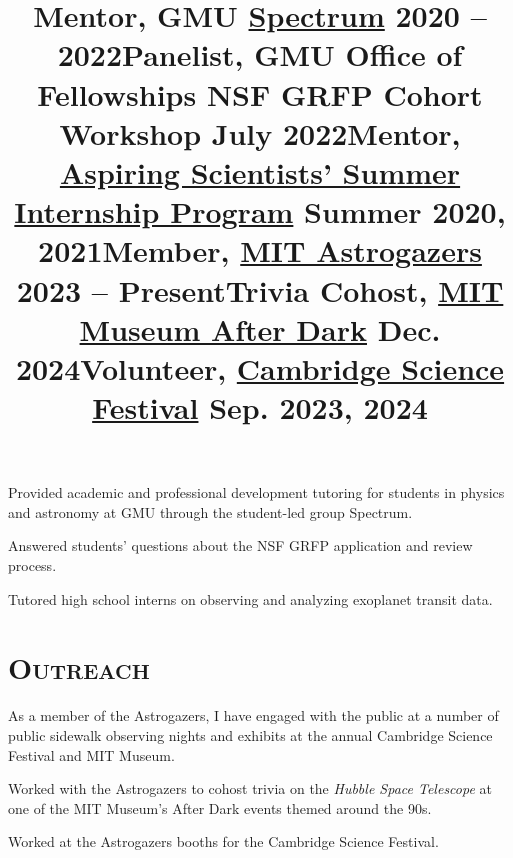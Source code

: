 \documentclass[marg, centered]{res}
\begin{document}
\begin{resume}
\vspace{-0.2cm}
\title{\textbf{Mentor}, GMU \href{https://gmuspectrum.squarespace.com/}{\color{dkbu} Spectrum} \hfill \textbf{2020 -- 2022}}
\begin{position}
{\small Provided academic and professional development tutoring for students in physics and astronomy at GMU through the student-led group Spectrum.}
\end{position}

\vspace{-0.2cm}
\title{\textbf{Panelist}, GMU Office of Fellowships NSF GRFP Cohort Workshop \hfill \textbf{July 2022}}
\begin{position}
{\small Answered students' questions about the NSF GRFP application and review process.}
\end{position}

\vspace{-0.2cm}
\title{\textbf{Mentor}, \href{https://science.gmu.edu/assip}{\color{dkbu} Aspiring Scientists' Summer Internship Program} \hfill \textbf{Summer 2020, 2021}}
\begin{position}
{\small Tutored high school interns on observing and analyzing exoplanet transit data.}
\end{position}

\section{{\scshape \bfseries Outreach}}

\title{\textbf{Member}, \href{https://astrogazers.mit.edu/}{\color{dkbu} MIT Astrogazers} \hfill \textbf{2023 -- Present}}
\begin{position}
{\small As a member of the Astrogazers, I have engaged with the public at a number of public sidewalk observing nights and exhibits at the annual Cambridge Science Festival and MIT Museum.}
\end{position}

\vspace{-0.2cm}
\title{\textbf{Trivia Cohost}, \href{https://mitmuseum.mit.edu/programs/mit-museum-after-dark}{\color{dkbu} MIT Museum After Dark} \hfill \textbf{Dec. 2024}}
\begin{position}
{\small Worked with the Astrogazers to cohost trivia on the \textit{Hubble Space Telescope} at one of the MIT Museum's After Dark events themed around the 90s.}
\end{position}

\vspace{-0.2cm}
\title{\textbf{Volunteer}, \href{https://cambridgesciencefestival.org/}{\color{dkbu} Cambridge Science Festival} \hfill \textbf{Sep. 2023, 2024}}
\begin{position}
{\small Worked at the Astrogazers booths for the Cambridge Science Festival.}
\end{position}


\end{resume}
\end{document}
